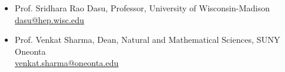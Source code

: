 \begin{itemize}%
%
%
%
\item Prof. Sridhara Rao Dasu, Professor, University of Wisconsin-Madison\\
\href{mailto:dasu@hep.wisc.edu}{{\Large \Letter} \hspace{0.025 cm} dasu@hep.wisc.edu}	

\item Prof. Venkat Sharma, Dean, Natural and Mathematical Sciences, SUNY Oneonta\\
\href{mailto:venkat.sharma@oneonta.edu}{{\Large \Letter} \hspace{0.025 cm} venkat.sharma@oneonta.edu}
\end{itemize}




